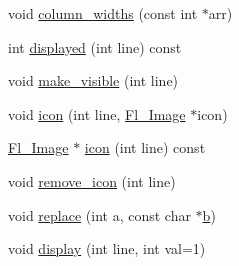 \begin{DoxyCompactItemize}
\item 
void \hyperlink{class_fl___browser_a89d1d56c2ae36454877ee2dc9297f5de}{column\+\_\+widths} (const int $\ast$arr)
\item 
int \hyperlink{class_fl___browser_aae4acb216ae3ae6261bd06fb9457e804}{displayed} (int line) const
\item 
void \hyperlink{class_fl___browser_ab104eab731c1d2036efb84a628b2dd55}{make\+\_\+visible} (int line)
\item 
void \hyperlink{class_fl___browser_a10f435e01236eb8b088b605a2172c12e}{icon} (int line, \hyperlink{class_fl___image}{Fl\+\_\+\+Image} $\ast$icon)
\item 
\hyperlink{class_fl___image}{Fl\+\_\+\+Image} $\ast$ \hyperlink{class_fl___browser_ad09239c82d1fe044b1f9a9366fd375e8}{icon} (int line) const
\item 
void \hyperlink{class_fl___browser_a1b4cff377af53e9c30e43264ac3e6ce5}{remove\+\_\+icon} (int line)
\item 
void \hyperlink{class_fl___browser_aedeec78b5054172ffcd79340c0d8f184}{replace} (int a, const char $\ast$\hyperlink{forms_8_h_a0ba06a290a384fa06b1b90745827dae2}{b})
\item 
void \hyperlink{class_fl___browser_ade1a745e0ceaae412f4365a0057598da}{display} (int line, int val=1)
\end{DoxyCompactItemize}
